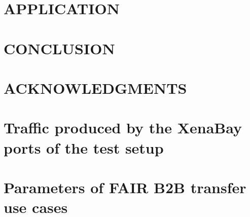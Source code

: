 \documentclass[%
 reprint,
 amsmath,amssymb,
 aps,
]{revtex4-1}
\begin{document}
\section{\label{application}APPLICATION}


\section{\label{conclusion}CONCLUSION}


\section{\label{acknowledgments}ACKNOWLEDGMENTS}





\onecolumngrid
\newpage
\appendix
\section{\label{appendixwr}Traffic produced by the XenaBay ports of the test setup}

\section{\label{appendix}Parameters of FAIR B2B transfer use cases}

\end{document}
